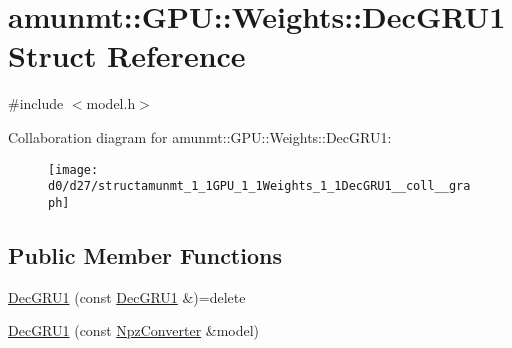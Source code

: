 \hypertarget{structamunmt_1_1GPU_1_1Weights_1_1DecGRU1}{}\section{amunmt\+:\+:G\+PU\+:\+:Weights\+:\+:Dec\+G\+R\+U1 Struct Reference}
\label{structamunmt_1_1GPU_1_1Weights_1_1DecGRU1}


{\ttfamily \#include $<$model.\+h$>$}



Collaboration diagram for amunmt\+:\+:G\+PU\+:\+:Weights\+:\+:Dec\+G\+R\+U1\+:
\nopagebreak
\begin{figure}[H]
\begin{center}
\leavevmode
\texttt{[image: d0/d27/structamunmt\_1\_1GPU\_1\_1Weights\_1\_1DecGRU1\_\_coll\_\_graph]}
\end{center}
\end{figure}
\subsection*{Public Member Functions}
\begin{DoxyCompactItemize}
\item 
\hyperlink{structamunmt_1_1GPU_1_1Weights_1_1DecGRU1_a30340cf9aa803ad1c8c3fd852151f0ef}{Dec\+G\+R\+U1} (const \hyperlink{structamunmt_1_1GPU_1_1Weights_1_1DecGRU1}{Dec\+G\+R\+U1} \&)=delete
\item 
\hyperlink{structamunmt_1_1GPU_1_1Weights_1_1DecGRU1_a068db6fd288627e87a4f72ad86ce242d}{Dec\+G\+R\+U1} (const \hyperlink{classamunmt_1_1GPU_1_1NpzConverter}{Npz\+Converter} \&model)
\end{DoxyCompactItemize}
